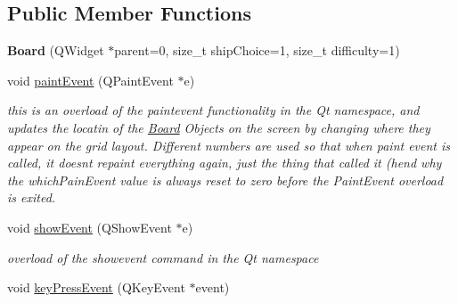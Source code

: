 \subsection*{Public Member Functions}
\begin{DoxyCompactItemize}
\item 
\hypertarget{class_board_a15bd5851edaa12360f7b69724a70be51}{}{\bfseries Board} (Q\+Widget $\ast$parent=0, size\+\_\+t ship\+Choice=1, size\+\_\+t difficulty=1)\label{class_board_a15bd5851edaa12360f7b69724a70be51}

\item 
void \hyperlink{class_board_ad521d810316bf6aefabcbb3c4cad316e}{paint\+Event} (Q\+Paint\+Event $\ast$e)
\begin{DoxyCompactList}\small\item\em this is an overload of the paintevent functionality in the Qt namespace, and updates the locatin of the \hyperlink{class_board}{Board} Objects on the screen by changing where they appear on the grid layout. Different numbers are used so that when paint event is called, it doesn\textquotesingle{}t repaint everything again, just the thing that called it (hend why the which\+Pain\+Event value is always reset to zero before the Paint\+Event overload is exited. \end{DoxyCompactList}\item 
void \hyperlink{class_board_a01d4cc6631ae9042fd1f83c58d6fec8f}{show\+Event} (Q\+Show\+Event $\ast$e)
\begin{DoxyCompactList}\small\item\em overload of the showevent command in the Qt namespace \end{DoxyCompactList}\item 
\hypertarget{class_board_a69e3222342a38b98d4d82522921164ba}{}void \hyperlink{class_board_a69e3222342a38b98d4d82522921164ba}{key\+Press\+Event} (Q\+Key\+Event $\ast$event)\label{class_board_a69e3222342a38b98d4d82522921164ba}


\end{DoxyCompactItemize}
